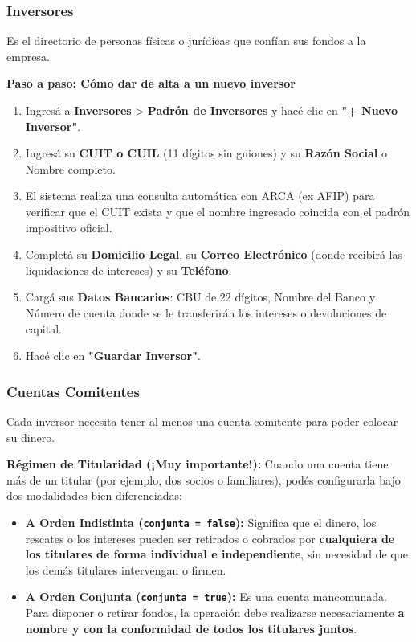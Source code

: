 \documentclass[12pt,a4paper]{article}
\renewcommand{\_}{\textunderscore\allowbreak}
\begin{document}
\subsubsection{Inversores}
Es el directorio de personas físicas o jurídicas que confían sus fondos a la empresa.

\textbf{Paso a paso: Cómo dar de alta a un nuevo inversor}
\begin{enumerate}
    \item Ingresá a \textbf{Inversores} > \textbf{Padrón de Inversores} y hacé clic en \textbf{"+ Nuevo Inversor"}.
    \item Ingresá su \textbf{CUIT o CUIL} (11 dígitos sin guiones) y su \textbf{Razón Social} o Nombre completo.
    \item El sistema realiza una consulta automática con ARCA (ex AFIP) para verificar que el CUIT exista y que el nombre ingresado coincida con el padrón impositivo oficial.
    \item Completá su \textbf{Domicilio Legal}, su \textbf{Correo Electrónico} (donde recibirá las liquidaciones de intereses) y su \textbf{Teléfono}.
    \item Cargá sus \textbf{Datos Bancarios}: CBU de 22 dígitos, Nombre del Banco y Número de cuenta donde se le transferirán los intereses o devoluciones de capital.
    \item Hacé clic en \textbf{"Guardar Inversor"}.
\end{enumerate}

\subsubsection{Cuentas Comitentes}
Cada inversor necesita tener al menos una cuenta comitente para poder colocar su dinero. 

\textbf{Régimen de Titularidad (¡Muy importante!):}
Cuando una cuenta tiene más de un titular (por ejemplo, dos socios o familiares), podés configurarla bajo dos modalidades bien diferenciadas:
\begin{itemize}
    \item \textbf{A Orden Indistinta (\texttt{conjunta = false}):} Significa que el dinero, los rescates o los intereses pueden ser retirados o cobrados por \textbf{cualquiera de los titulares de forma individual e independiente}, sin necesidad de que los demás titulares intervengan o firmen.
    \item \textbf{A Orden Conjunta (\texttt{conjunta = true}):} Es una cuenta mancomunada. Para disponer o retirar fondos, la operación debe realizarse necesariamente \textbf{a nombre y con la conformidad de todos los titulares juntos}.
\end{itemize}
\end{document}
